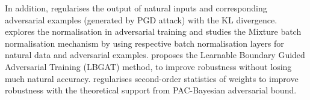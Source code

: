 In addition, \cite{zhang2019theoretically} regularises the output of natural inputs and corresponding adversarial examples (generated by PGD attack) with the KL divergence. \cite{xie2019intriguing} explores the normalisation in adversarial training and studies the Mixture batch normalisation mechanism by using respective batch normalisation layers for natural data and adversarial examples. \cite{cui2021learnable} proposes the Learnable Boundary Guided Adversarial Training (LBGAT) method, to improve robustness without losing much natural accuracy. \cite{jin2022enhancing} regularises second-order statistics of weights to improve robustness with the theoretical support from PAC-Bayesian adversarial bound.  






















